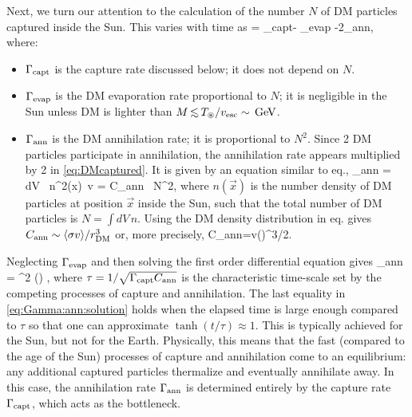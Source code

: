 \smallskip


Next, we turn our attention to the calculation of
 the number $N$ of DM particles captured inside the Sun.
This varies with time as
\beq {} = \Gamma_{\rm capt}- \Gamma_{\rm evap} -2\Gamma_{\rm ann},
\label{eq:DMcaptured}
\eeq
where: 
\begin{itemize}
\item[$\triangleright$] $\Gamma_{\rm capt}$ is the capture rate discussed below; it does not depend on $N$.
\item[$\triangleright$] $\Gamma_{\rm evap}$ is the DM evaporation rate proportional to $N$; it is negligible in the Sun unless DM is lighter than $M \circa{<} T_\circledast/v_{\rm esc}\sim\GeV$\label{vescSun}.
\item[$\triangleright$] $\Gamma_{\rm ann}$ is the DM annihilation rate; it is proportional to $N^2$. 
Since 2 DM particles participate in annihilation, the annihilation rate appears multiplied by 2 in \eqref{eq:DMcaptured}.
It is given by an equation similar to eq.,
\Gamma_{\rm ann} = 
\int dV \, n^2(\vec x)\, \langle \sigma v \rangle = C_{\rm ann} \, N^2,
\eeq
where $n(\vec x)$ is the number density of DM particles at position $\vec x$ inside the Sun, 
such that the total number of DM particles is $N=\int dV\, n$.
Using the DM density distribution in eq. gives
$C_{\rm ann} \sim \langle\sigma v\rangle/r_{\rm DM}^3$ or, more precisely,
\beq \label{eq:C_A}
C_{\rm ann}=\langle\sigma v\rangle \left(\right)^{3/2}.
\eeq
\end{itemize}
Neglecting $\Gamma_{\rm evap}$ and then solving the first order differential equation 
gives
\beq 
\label{eq:Gamma:ann:solution}
\Gamma_{\rm ann} =  \tanh^2 \left(\right) \simeq {},
\eeq
where $\tau = 1/\sqrt{\Gamma_{\rm capt} C_{\rm ann}}$ is the characteristic time-scale set by the competing processes of capture and annihilation. The last equality in \eqref{eq:Gamma:ann:solution} holds when the elapsed time is large enough compared to $\tau$ so that one can approximate $\tanh(t/\tau)\approx 1$. 
This is typically achieved for the Sun, but not for the Earth. 
Physically, this means that the fast (compared to the age of the Sun) processes of capture and annihilation come to an equilibrium: any additional captured particles thermalize and eventually annihilate away.
In this case, the annihilation rate $\Gamma_{\rm ann}$ is 
determined entirely by the capture rate $\Gamma_{\rm capt}$, which acts as the bottleneck. 


